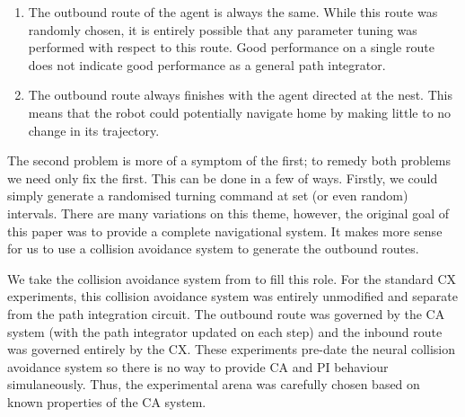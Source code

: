 \documentclass[a4paper,11pt,twoside,openright]{article}
\begin{document}
\begin{enumerate}
\item{
  The outbound route of the agent is always the same. While this route
  was randomly chosen, it is entirely possible that any parameter tuning was
  performed with respect to this route. Good performance on a single route does
  not indicate good performance as a general path integrator.
}

\item{
  The outbound route always finishes with the agent directed at the nest. This
  means that the robot could potentially navigate home by making little to no
  change in its trajectory.
}
\end{enumerate}

The second problem is more of a symptom of the first; to remedy both problems we
need only fix the first. This can be done in a few of ways. Firstly, we could
simply generate a randomised turning command at set (or even random) intervals.
There are many variations on this theme, however, the original goal of this paper
was to provide a complete navigational system. It makes more sense for us to use
a collision avoidance system to generate the outbound routes.
\newline\par

We take the collision avoidance system from \cite{Mitchell2018} to fill this
role. For the standard CX experiments, this collision avoidance system was
entirely unmodified and separate from the path integration circuit. The outbound
route was governed by the CA system (with the path integrator updated on each
step) and the inbound route was governed entirely by the CX. These experiments
pre-date the neural collision avoidance system so there is no way to provide
CA and PI behaviour simulaneously. Thus, the experimental arena was carefully
chosen based on known properties of the CA system.
\newline
\par
\end{document}
